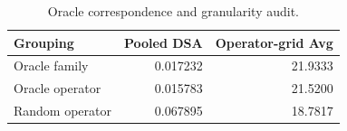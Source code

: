 \begin{table}[!ht]
\centering
\small
\caption{Oracle correspondence and granularity audit.}
\label{tab:oracle-granularity}
\begin{tabular}{lrr}
\toprule
Grouping & Pooled DSA & Operator-grid Avg \\
\midrule
Oracle family & 0.017232 & 21.9333 \\
Oracle operator & 0.015783 & 21.5200 \\
Random operator & 0.067895 & 18.7817 \\
\bottomrule
\end{tabular}
\end{table}
